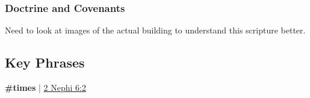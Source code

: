 	
		
		
	\subsubsection{Doctrine and Covenants} %
		\label{ORDER-DC}
	
		
		\begin{compactdesc}
			\item[{\hyperref[DC94-6]{DC 94:6}}] Need to look at images of the actual building to understand this scripture better.
		\end{compactdesc}
		
	
		
		
\subsection{Key Phrases} %
	\label{ORDER-PHRASES}

	\begin{compactdesc}
		\item[holy order] \textbf{\#times} | \hyperref[2NEPHI-6-2]{2 Nephi 6:2}
	\end{compactdesc}
	
